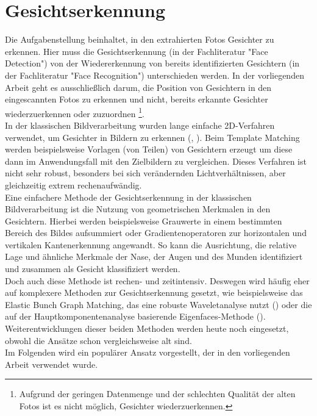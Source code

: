 \chapter{Gesichtserkennung}
Die Aufgabenstellung beinhaltet, in den extrahierten Fotos Gesichter zu erkennen. Hier muss die Gesichtserkennung (in der Fachliteratur "Face Detection") von der Wiedererkennung von bereits identifizierten Gesichtern (in der Fachliteratur "Face Recognition") unterschieden werden. In der vorliegenden Arbeit geht es ausschließlich darum, die Position von Gesichtern in den eingescannten Fotos zu erkennen und nicht, bereits erkannte Gesichter wiederzuerkennen oder zuzuordnen \footnote{Aufgrund der geringen Datenmenge und der schlechten Qualität der alten Fotos ist es nicht möglich, Gesichter wiederzuerkennen.}.\\
In der klassischen Bildverarbeitung wurden lange einfache 2D-Verfahren verwendet, um Gesichter in Bildern zu erkennen (\cite{Kees2012}, \cite{Wachter2001}). Beim Template Matching werden beispielsweise Vorlagen (von Teilen) von Gesichtern erzeugt um diese dann im Anwendungsfall mit den Zielbildern zu vergleichen. Dieses Verfahren ist nicht sehr robust, besonders bei sich verändernden Lichtverhältnissen, aber gleichzeitig extrem rechenaufwändig. \\
Eine einfachere Methode der Gesichtserkennung in der klassischen Bildverarbeitung ist die Nutzung von geometrischen Merkmalen in den Gesichtern. Hierbei werden beispielsweise Grauwerte in einem bestimmten Bereich des Bildes aufsummiert oder Gradientenoperatoren zur horizontalen und vertikalen Kantenerkennung angewandt. So kann die Ausrichtung, die relative Lage und ähnliche Merkmale der Nase, der Augen und des Munden identifiziert und zusammen als Gesicht klassifiziert werden. \\
Doch auch diese Methode ist rechen- und zeitintensiv. Deswegen wird häufig eher auf komplexere Methoden zur Gesichtserkennung gesetzt, wie beispielsweise das Elastic Bunch Graph Matching, das eine robuste Waveletanalyse nutzt (\cite{Wiskott1999}) oder die auf der Hauptkomponentenanalyse basierende Eigenfaces-Methode (\cite{doi:10.1162/jocn.1991.3.1.71}). Weiterentwicklungen dieser beiden Methoden werden heute noch eingesetzt, obwohl die Ansätze schon vergleichsweise alt sind. \\
Im Folgenden wird ein populärer Ansatz vorgestellt, der in den vorliegenden Arbeit verwendet wurde. 

